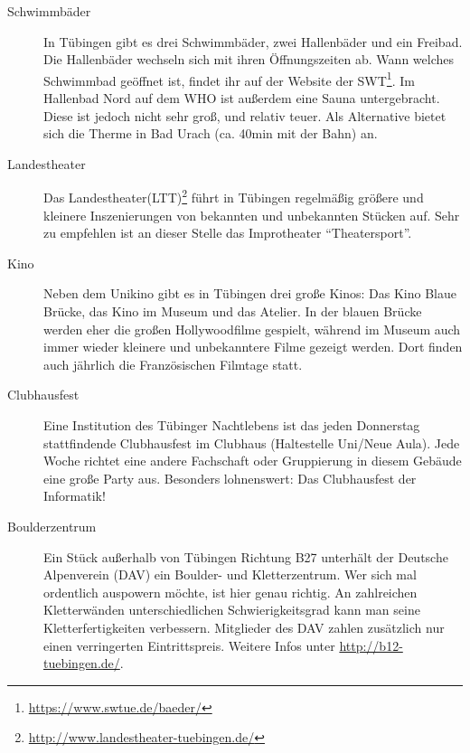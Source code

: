 
\begin{description}
\item[Schwimmbäder]
In Tübingen gibt es drei Schwimmbäder, zwei Hallenbäder und ein Freibad. Die Hallenbäder wechseln sich mit ihren Öffnungszeiten ab. Wann welches Schwimmbad geöffnet ist, findet ihr auf der Website der SWT\footnote{\url{https://www.swtue.de/baeder/}}. Im Hallenbad Nord auf dem WHO ist außerdem eine Sauna untergebracht. Diese ist jedoch nicht sehr groß, und relativ teuer. Als Alternative bietet sich die Therme in Bad Urach (ca. 40min mit der Bahn) an.	%

\item[Landestheater]
Das Landestheater(LTT)\footnote{\url{http://www.landestheater-tuebingen.de/}} führt in Tübingen regelmäßig größere und kleinere Inszenierungen von bekannten und unbekannten Stücken auf. Sehr zu empfehlen ist an dieser Stelle das Improtheater "`Theatersport"'.	%

\item[Kino]
Neben dem Unikino gibt es in Tübingen drei große Kinos: Das Kino Blaue Brücke, das Kino im Museum und das Atelier. In der blauen Brücke werden eher die großen Hollywoodfilme gespielt, während im Museum auch immer wieder kleinere und unbekanntere Filme gezeigt werden. Dort finden auch jährlich die Französischen Filmtage statt.

\item[Clubhausfest]
Eine Institution des Tübinger Nachtlebens ist das jeden Donnerstag stattfindende Clubhausfest im Clubhaus (Haltestelle Uni/Neue Aula). Jede Woche richtet eine andere Fachschaft oder Gruppierung in diesem Gebäude eine große Party aus. Besonders lohnenswert: Das Clubhausfest der Informatik!

\item[Boulderzentrum]
Ein Stück außerhalb von Tübingen Richtung B27 unterhält der Deutsche Alpenverein (DAV) ein Boulder- und Kletterzentrum. Wer sich mal ordentlich auspowern möchte, ist hier genau richtig. An zahlreichen Kletterwänden unterschiedlichen Schwierigkeitsgrad kann man seine Kletterfertigkeiten verbessern. Mitglieder des DAV zahlen zusätzlich nur einen verringerten Eintrittspreis. Weitere Infos unter \url{http://b12-tuebingen.de/}.	%
\end{description}
